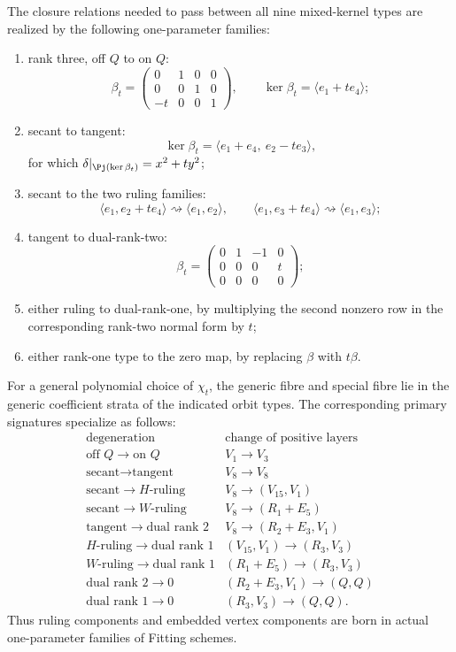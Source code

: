 \begin{theorem}
\label{thm:coranktwo-specialization-laws}
The closure relations needed to pass between all nine mixed-kernel
types are realized by the following one-parameter families:
\begin{enumerate}
\item rank three, off \(Q\) to on \(Q\):
\[
 \beta_t=
 \begin{pmatrix}0&1&0&0\\0&0&1&0\\-t&0&0&1\end{pmatrix},
 \qquad \ker\beta_t=\langle e_1+t e_4\rangle;
\]
\item secant to tangent:
\[
 \ker\beta_t=\langle e_1+e_4,\ e_2-t e_3\rangle,
\]
for which \(\delta|_{\Pj(\ker\beta_t)}=x^2+t y^2\);
\item secant to the two ruling families:
\[
 \langle e_1,e_2+t e_4\rangle\rightsquigarrow
 \langle e_1,e_2\rangle,\qquad
 \langle e_1,e_3+t e_4\rangle\rightsquigarrow
 \langle e_1,e_3\rangle;
\]
\item tangent to dual-rank-two:
\[
 \beta_t=
 \begin{pmatrix}0&1&-1&0\\0&0&0&t\\0&0&0&0\end{pmatrix};
\]
\item either ruling to dual-rank-one, by multiplying the second
nonzero row in the corresponding rank-two normal form by \(t\);
\item either rank-one type to the zero map, by replacing
\(\beta\) with \(t\beta\).
\end{enumerate}
For a general polynomial choice of \(\chi_t\), the generic fibre
and special fibre lie in the generic coefficient strata of the
indicated orbit types.  The corresponding primary signatures
specialize as follows:
\[
\begin{array}{l|l}
\text{degeneration}&\text{change of positive layers}\\ \hline
\text{off }Q\to\text{on }Q&V_1\to V_3\\
\text{secant}\to\text{tangent}&V_8\to V_8\\
\text{secant}\to H\text{-ruling}&V_8\to(V_{15},V_1)\\
\text{secant}\to W\text{-ruling}&V_8\to(R_1+E_5)\\
\text{tangent}\to\text{dual rank }2&V_8\to(R_2+E_3,V_1)\\
H\text{-ruling}\to\text{dual rank }1&(V_{15},V_1)\to(R_3,V_3)\\
W\text{-ruling}\to\text{dual rank }1&(R_1+E_5)\to(R_3,V_3)\\
\text{dual rank }2\to0&(R_2+E_3,V_1)\to(Q,Q)\\
\text{dual rank }1\to0&(R_3,V_3)\to(Q,Q).
\end{array}
\]
Thus ruling components and embedded vertex components are born in
actual one-parameter families of Fitting schemes.
\end{theorem}

